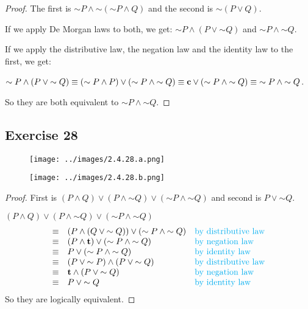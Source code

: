 \documentclass[14pt]{extarticle}
\newcommand{\true}{{\bf t}}
\newcommand{\false}{{\bf c}}
\begin{document}
\begin{proof}
    The first is ${\sim P} \wedge {\sim ({\sim P} \wedge Q)}$ and the second is ${\sim (P \vee Q)}$.

    If we apply De Morgan laws to both, we get: ${\sim P} \wedge (P \vee {\sim Q})$ and ${\sim P} \wedge {\sim Q}$.

    If we apply the distributive law, the negation law and the identity law to the first, we get:

    ${\sim P} \wedge (P \vee {\sim Q}) \equiv ({\sim P} \wedge P) \vee ({\sim P} \wedge {\sim Q}) \equiv \false \vee ({\sim P} \wedge {\sim Q}) \equiv {\sim P} \wedge {\sim Q}$.

    So they are both equivalent to ${\sim P} \wedge {\sim Q}$. \end{proof}

\subsection{Exercise 28}
\begin{figure}[ht!]
    \centering
    \texttt{[image: ../images/2.4.28.a.png]}
\end{figure}

\begin{figure}[ht!]
    \centering
    \texttt{[image: ../images/2.4.28.b.png]}
\end{figure}

\begin{proof}
    First is $(P \wedge Q) \vee (P \wedge {\sim Q}) \vee ({\sim P} \wedge {\sim Q})$ and second is $P \vee {\sim Q}$.

    $(P \wedge Q) \vee (P \wedge {\sim Q}) \vee ({\sim P} \wedge {\sim Q})$
    $$
        \begin{array}{cll}
            \equiv    & (P \wedge (Q \vee {\sim Q})) \vee ({\sim P} \wedge
            {\sim Q}) & \text{\color{cyan}by distributive law}                                                      \\
            \equiv    & (P \wedge \true) \vee ({\sim P} \wedge {\sim Q})   & \text{\color{cyan}by negation law}     \\
            \equiv    & P \vee ({\sim P} \wedge {\sim Q})                  & \text{\color{cyan}by identity law}     \\
            \equiv    & (P \vee {\sim P}) \wedge (P \vee {\sim Q})         & \text{\color{cyan}by distributive law} \\
            \equiv    & \true \wedge (P \vee {\sim Q})                     & \text{\color{cyan}by negation law}     \\
            \equiv    & P \vee {\sim Q}                                    & \text{\color{cyan}by identity law}     \\
        \end{array}
    $$
    So they are logically equivalent.
\end{proof}
\end{document}
